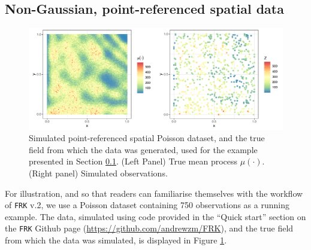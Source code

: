 \documentclass[12pt,a4paper]{article}
\begin{document}
\subsection{Non-Gaussian, point-referenced spatial data}\label{sec:03-01:Poisson}


\begin{figure}[t!]
    \centering
    \includegraphics[width = 0.75\linewidth]{Images/Poisson_true_and_Z.pdf}
    \caption{Simulated point-referenced spatial Poisson dataset, and the true field from which the data was generated, used for the example presented in Section \ref{sec:03-01:Poisson}. (Left Panel) True mean process $\mu(\cdot)$. (Right panel) Simulated observations.  
}   
  \label{fig:Poisson_true_and_Z}
\end{figure}


For illustration, and so that readers can familiarise themselves with the workflow of \texttt{FRK} v.2, we use a Poisson dataset containing 750 observations as a running example. 
The data, simulated using code provided in the ``Quick start'' section on the \texttt{FRK} Github page (\url{https://github.com/andrewzm/FRK}), and the true field from which the data was simulated, is displayed in Figure \ref{fig:Poisson_true_and_Z}.
\end{document}
